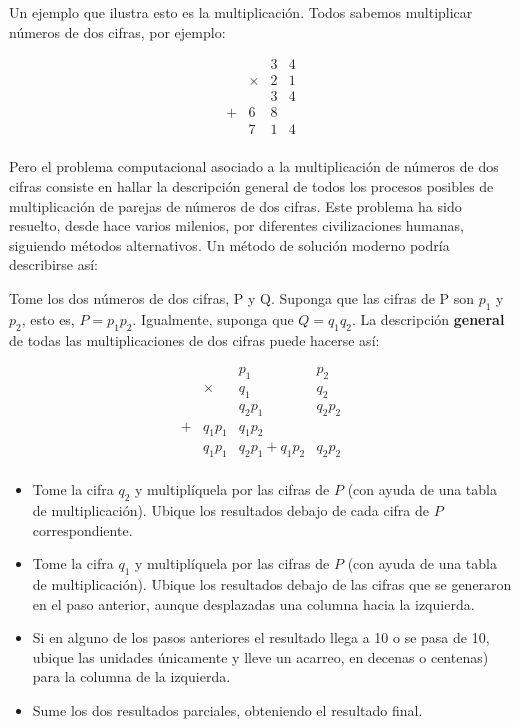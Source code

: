 Un ejemplo que ilustra esto es la multiplicación. Todos sabemos multiplicar números
de dos cifras, por ejemplo:

 \[
 \begin{array}{cccc}
           \ &\ &3&4\\
           \ & \times&2&1 \\ \hline
           \ &\ &3&4 \\
            +&6&8&\ \\  \hline
           \ &7&1&4 \\
 \end{array}
\]

Pero el problema computacional asociado a la multiplicación de números de dos
cifras consiste en hallar la descripción general de todos los procesos posibles
de multiplicación de parejas de números de dos cifras. Este problema ha sido
resuelto, desde hace varios milenios, por diferentes civilizaciones humanas,
siguiendo métodos alternativos. Un método de solución moderno podría describirse
así:

Tome los dos números de dos cifras, P y Q. Suponga que las cifras de P son $p_1$ y $p_2$,
esto es, $P=p_1p_2$. Igualmente, suponga que $Q=q_1q_2$. La descripción 
{\bf general} de todas las multiplicaciones de dos cifras puede hacerse así:

\[
  \begin{array}{cccc}
           \ &\ &p_1&p_2\\
           \ & \times&q_1&q_2 \\ \hline
           \ &\ &q_2p_1&q_2p_2 \\
            +&q_1p_1&q_1p_2&\ \\  \hline
           \ &q_1p_1&q_2p_1+q_1p_2&q_2p_2 \\
  \end{array}
\]

\begin{itemize}

\item Tome la cifra $q_2$ y multiplíquela por las cifras de  $P$ (con ayuda de una tabla de multiplicación). 
Ubique los resultados debajo de cada cifra de $P$ correspondiente. 

\item Tome la cifra $q_1$ y multiplíquela por las cifras de  $P$ (con ayuda de una tabla de multiplicación). 
Ubique los resultados debajo de las cifras que se generaron en el paso anterior, aunque desplazadas una columna hacia la izquierda.

\item Si en alguno de los pasos anteriores el resultado llega a 10 o se pasa de 10, ubique las unidades únicamente 
y lleve un acarreo, en decenas o centenas) para la columna de la izquierda.

\item Sume los dos resultados parciales, obteniendo el resultado final.

\end{itemize}

